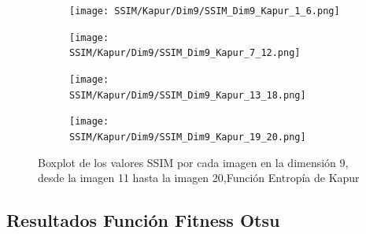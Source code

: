 \documentclass[conference]{IEEEtran}
\begin{document}
\begin{figure}
	\centering
	
	\begin{subfigure}{0.4\textwidth}
		\texttt{[image: SSIM/Kapur/Dim9/SSIM\_Dim9\_Kapur\_1\_6.png]}
	\end{subfigure}
	
	\begin{subfigure}{0.4\textwidth}
		\texttt{[image: SSIM/Kapur/Dim9/SSIM\_Dim9\_Kapur\_7\_12.png]}
	\end{subfigure}
	\begin{subfigure}{0.4\textwidth}
		\texttt{[image: SSIM/Kapur/Dim9/SSIM\_Dim9\_Kapur\_13\_18.png]}
	\end{subfigure}   
	\begin{subfigure}{0.4\textwidth}
		\texttt{[image: SSIM/Kapur/Dim9/SSIM\_Dim9\_Kapur\_19\_20.png]}
		\vspace{-120pt} %
	\end{subfigure}
	\caption{Boxplot de los valores SSIM por cada imagen en la dimensión 9, desde la imagen 11 hasta la imagen 20,Función Entropía de Kapur}
	\label{fig:imagenes}    
\end{figure}
\subsection{Resultados Función Fitness Otsu}
\end{document}
